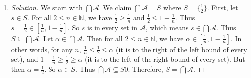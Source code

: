\documentclass{article}
\newcommand{\N}{{\mathbb N}}
\begin{document}
\begin{enumerate}
\item \begin{proof}[Solution]\let\qed\relax
	We start with $\bigcap \mathcal{A}$.
	We claim $\bigcap \mathcal{A} = S$ where $S = \{\frac{1}{2}\}$.
	First, let $s \in S$.
	For all $2\leq n \in\N$,
	we have $\frac{1}{2} \geq \frac{1}{n}$ and $\frac{1}{2} \leq 1-\frac{1}{n}$.
	Thus $s = \frac{1}{2} \in [\frac{1}{n}, 1-\frac{1}{n}]$.
	So $s$ is in every set in $\mathcal{A}$, which means $s \in \bigcap\mathcal{A}$.
	Thus $S \subseteq \bigcap \mathcal{A}$.
	Let $\alpha \in \bigcap\mathcal{A}$.
	Then for all $2 \leq n \in \N$, we have $\alpha \in [\frac{1}{n}, 1-\frac{1}{n}]$.
	In other words, for any $n$, $\frac{1}{n} \leq \frac{1}{2} \leq \alpha$
	(it is to the right of the left bound of every set),
	and $1-\frac{1}{n} \geq \frac{1}{2} \geq \alpha$
	(it is to the left of the right bound of every set).
	But then $\alpha = \frac{1}{2}$.
	So $\alpha \in S$.
	Thus $\bigcap \mathcal{A} \subseteq S0$.
	Therefore, $S = \bigcap \mathcal{A}$.


\end{proof}
\end{enumerate}
\end{document}

